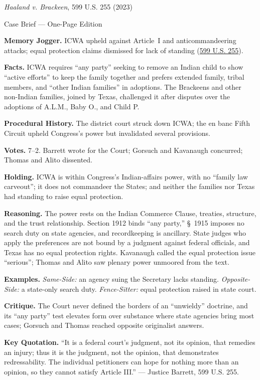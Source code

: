 \documentclass[12pt]{article}
\begin{document}
\begin{center}
{\Large \textit{Haaland v. Brackeen}, 599 U.S. 255 (2023)\par}
\vspace{0.3em}
{\normalsize Case Brief --- One-Page Edition\par}
\end{center}

\textbf{Memory Jogger.} ICWA upheld against Article~I and anticommandeering attacks; equal protection claims dismissed for lack of standing (\href{https://supreme.justia.com/cases/federal/us/599/21-376/}{599 U.S. 255}).

\textbf{Facts.} ICWA requires ``any party'' seeking to remove an Indian child to show ``active efforts'' to keep the family together and prefers extended family, tribal members, and ``other Indian families'' in adoptions. The Brackeens and other non-Indian families, joined by Texas, challenged it after disputes over the adoptions of A.L.M., Baby O., and Child P.

\textbf{Procedural History.} The district court struck down ICWA; the en banc Fifth Circuit upheld Congress's power but invalidated several provisions.

\textbf{Votes.} 7--2. Barrett wrote for the Court; Gorsuch and Kavanaugh concurred; Thomas and Alito dissented.

\textbf{Holding.} ICWA is within Congress's Indian-affairs power, with no ``family law carveout''; it does not commandeer the States; and neither the families nor Texas had standing to raise equal protection.

\textbf{Reasoning.} The power rests on the Indian Commerce Clause, treaties, structure, and the trust relationship. Section 1912 binds ``any party,'' \S~1915 imposes no search duty on state agencies, and recordkeeping is ancillary. State judges who apply the preferences are not bound by a judgment against federal officials, and Texas has no equal protection rights. Kavanaugh called the equal protection issue ``serious''; Thomas and Alito saw plenary power unmoored from the text.

\textbf{Examples.} \emph{Same-Side:} an agency suing the Secretary lacks standing. \emph{Opposite-Side:} a state-only search duty. \emph{Fence-Sitter:} equal protection raised in state court.

\textbf{Critique.} The Court never defined the borders of an ``unwieldy'' doctrine, and its ``any party'' test elevates form over substance where state agencies bring most cases; Gorsuch and Thomas reached opposite originalist answers.

\textbf{Key Quotation.} ``It is a federal court's judgment, not its opinion, that remedies an injury; thus it is the judgment, not the opinion, that demonstrates redressability. The individual petitioners can hope for nothing more than an opinion, so they cannot satisfy Article III.'' --- Justice Barrett, 599 U.S. 255.
\end{document}
